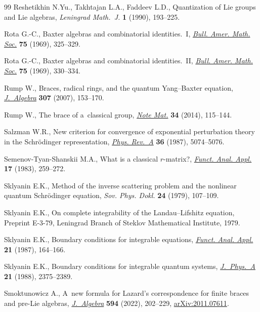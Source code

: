 \documentclass[10pt,a4paper]{amsart}
\numberwithin{equation}{section}
\theoremstyle{definition}
\begin{document}
\begin{thebibliography}{99}
Reshetikhin N.Yu., Takhtajan L.A., Faddeev L.D., Quantization of {L}ie groups
 and {L}ie algebras, \textit{Leningrad Math.~J.} \textbf{1} (1990), 193--225.

Rota G.-C., Baxter algebras and combinatorial identities.~{I},
 \href{https://doi.org/10.1090/S0002-9904-1969-12156-7}{\textit{Bull. Amer.
 Math. Soc.}} \textbf{75} (1969), 325--329.

Rota G.-C., Baxter algebras and combinatorial identities.~{II},
 \href{https://doi.org/10.1090/S0002-9904-1969-12158-0}{\textit{Bull. Amer.
 Math. Soc.}} \textbf{75} (1969), 330--334.

Rump W., Braces, radical rings, and the quantum {Y}ang--{B}axter equation,
 \href{https://doi.org/10.1016/j.jalgebra.2006.03.040}{\textit{J.~Algebra}}
 \textbf{307} (2007), 153--170.

Rump W., The brace of a~classical group,
 \href{https://doi.org/10.1285/i15900932v34n1p115}{\textit{Note Mat.}}
 \textbf{34} (2014), 115--144.

Salzman W.R., New criterion for convergence of exponential perturbation theory
 in the {S}chr\"odinger representation,
 \href{https://doi.org/10.1103/PhysRevA.36.5074}{\textit{Phys. Rev.~A}}
 \textbf{36} (1987), 5074--5076.

Semenov-Tyan-Shanskii M.A., What is a classical $r$-matrix?,
 \href{https://doi.org/10.1007/BF01076717}{\textit{Funct. Anal. Appl.}}
 \textbf{17} (1983), 259--272.


Sklyanin E.K., Method of the inverse scattering problem and the nonlinear
 quantum {S}chr\"odinger equation, \textit{Sov. Phys. Dokl.} \textbf{24}
 (1979), 107--109.

Sklyanin E.K., On complete integrability of the {L}andau--{L}ifshitz equation,
 {P}reprint E-3-79, Leningrad Branch of Steklov Mathematical Institute, 1979.

Sklyanin E.K., Boundary conditions for integrable equations,
 \href{https://doi.org/10.1007/BF01078038}{\textit{Funct. Anal. Appl.}}
 \textbf{21} (1987), 164--166.

Sklyanin E.K., Boundary conditions for integrable quantum systems,
 \href{https://doi.org/10.1088/0305-4470/21/10/015}{\textit{J.~Phys.~A}}
 \textbf{21} (1988), 2375--2389.

Smoktunowicz A., A~new formula for {L}azard's correspondence for finite braces
 and pre-{L}ie algebras,
 \href{https://doi.org/10.1016/j.jalgebra.2021.11.027}{\textit{J.~Algebra}}
 \textbf{594} (2022), 202--229,
 \href{http://arxiv.org/abs/2011.07611}{arXiv:2011.07611}.


\end{thebibliography}
\end{document}
